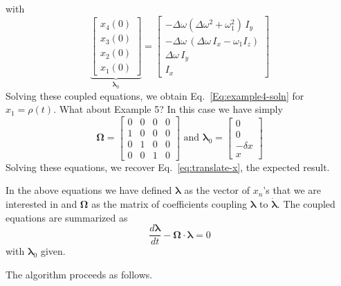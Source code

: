 with
\begin{equation}
\underbrace{\begin{bmatrix} 
x_4(0) \\ x_3(0) \\ x_2(0) \\ x_1(0) 
\end{bmatrix}}_{{\bm{\lambda}}_0}
=
\begin{bmatrix}
	- \Delta\omega (\Delta\omega^2 + \omega_1^2) \, I_y \\
	-\Delta\omega \, (\Delta\omega \, I_x - \omega_1 I_z)  \\
	\Delta \omega \, I_y \\
	I_x 
\end{bmatrix}
\end{equation}
Solving these coupled equations, we obtain Eq.~\ref{Eq:example4-soln} for $x_1 = \rho(t)$.  
What about Example 5?  In this case we have simply
\begin{equation}
\bm{\Omega} = 
  \begin{bmatrix}
  0 & 0 & 0 & 0 \\
  1 & 0 & 0 & 0 \\
  0 & 1 & 0 & 0 \\
  0 & 0 & 1 & 0
  \end{bmatrix}
\text{ and }
{\bm{\lambda}}_0 = 
  \begin{bmatrix}
  0 \\ 0 \\ -\delta x \\ x
  \end{bmatrix}
\end{equation}
Solving these equations, we recover Eq.~\ref{eq:translate-x}, the expected result.

In the above equations we have defined $\bm{\lambda}$ as the vector of $x_n$'s that we are interested in and $\bm{\Omega}$ as the matrix of coefficients coupling $\bm{\lambda}$ to $\dot{\bm{\lambda}}$.  The coupled equations are summarized as
\begin{equation}
\frac{d \bm{\lambda}}{d t} 
	- \bm{\Omega} \cdot \bm{\lambda} 
	= 0
	\label{Eq:big-equation}
\end{equation} 
with $\bm{\lambda}_0$ given.  

The  algorithm proceeds as follows.

